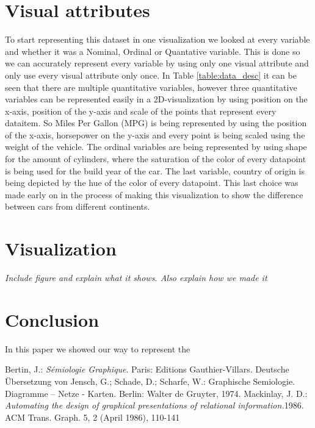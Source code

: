 \documentclass{article}
\begin{document}
\section{Visual attributes}
To start representing this dataset in one visualization we looked at every variable and whether it was a Nominal, Ordinal or Quantative variable. This is done so we can accurately represent every variable by using only one visual attribute and only use every visual attribute only once. In Table \ref{table:data_desc} it can be seen that there are multiple quantitative variables, however three quantitative variables can be represented easily in a 2D-visualization by using position on the x-axis, position of the y-axis and scale of the points that represent every dataitem. So Miles Per Gallon (MPG) is being represented by using the position of the x-axis, horsepower on the y-axis and every point is being scaled using the weight of the vehicle. The ordinal variables are being represented by using shape for the amount of cylinders, where the saturation of the color of every datapoint is being used for the build year of the car. The last variable, country of origin is being depicted by the hue of the color of every datapoint. This last choice was made early on in the process of making this visualization to show the difference between cars from different continents.

\section{Visualization}
\textit{Include figure and explain what it shows. Also explain how we made it}

\section{Conclusion}
In this paper we showed our way to represent the 


\begin{thebibliography}{99}
Bertin, J.: \emph{Sémiologie Graphique}. Paris: Editions Gauthier-Villars. Deutsche Übersetzung von Jensch, G.; Schade, D.; Scharfe, W.: Graphische Semiologie. Diagramme – Netze - Karten. Berlin: Walter de Gruyter, 1974.
Mackinlay, J. D.: \emph{Automating the design of graphical presentations of relational information.}1986. ACM Trans. Graph. 5, 2 (April 1986), 110-141
\end{thebibliography}
\end{document}
